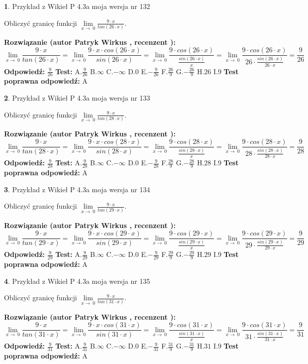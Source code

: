 \documentclass[12pt, a4paper]{article}
\theoremstyle{definition} %
\newtheorem{zad}{}
\newcommand{\zadStart}[1]{\begin{zad}#1\newline}
\newcommand{\zadStop}{\end{zad}}
\newcommand{\rozwStart}[2]{\noindent \textbf{Rozwiązanie (autor #1 , recenzent #2): }\newline}
\newcommand{\rozwStop}{\newline}
\newcommand{\odpStart}{\noindent \textbf{Odpowiedź:}\newline}
\newcommand{\odpStop}{\newline}
\newcommand{\testStart}{\noindent \textbf{Test:}\newline}
\newcommand{\testStop}{\newline}
\newcommand{\kluczStart}{\noindent \textbf{Test poprawna odpowiedź:}\newline}
\newcommand{\kluczStop}{\newline}
\begin{document}
\zadStart{Przykład z Wikieł P 4.3a moja wersja nr 132}


Obliczyć granicę funkcji $\lim\limits_{x\to\ 0}\frac{9 \cdot x}{tan(26 \cdot x)}$.
\zadStop
\rozwStart{Patryk Wirkus}{}
$$\lim\limits_{x\to\ 0}\frac{9 \cdot x}{tan(26 \cdot x)}=\lim\limits_{x\to\ 0}\frac{9 \cdot x \cdot cos(26 \cdot x)}{sin(26 \cdot x)}=\lim\limits_{x\to\ 0}\frac{9 \cdot cos(26 \cdot x)}{\frac{sin(26 \cdot x)}{x}}=\lim\limits_{x\to\ 0}\frac{9 \cdot cos(26 \cdot x)}{26 \cdot \frac{sin(26 \cdot x)}{26 \cdot x}} = \frac{9}{26}$$
\rozwStop
\odpStart
$\frac{9}{26}$
\odpStop
\testStart
A.$\frac{9}{26}$
B.$\infty$
C.$-\infty$
D.$0$
E.$-\frac{9}{26}$
F.$\frac{26}{9}$
G.$-\frac{26}{9}$
H.$26$
I.$9$
\testStop
\kluczStart
A
\kluczStop



\zadStart{Przykład z Wikieł P 4.3a moja wersja nr 133}


Obliczyć granicę funkcji $\lim\limits_{x\to\ 0}\frac{9 \cdot x}{tan(28 \cdot x)}$.
\zadStop
\rozwStart{Patryk Wirkus}{}
$$\lim\limits_{x\to\ 0}\frac{9 \cdot x}{tan(28 \cdot x)}=\lim\limits_{x\to\ 0}\frac{9 \cdot x \cdot cos(28 \cdot x)}{sin(28 \cdot x)}=\lim\limits_{x\to\ 0}\frac{9 \cdot cos(28 \cdot x)}{\frac{sin(28 \cdot x)}{x}}=\lim\limits_{x\to\ 0}\frac{9 \cdot cos(28 \cdot x)}{28 \cdot \frac{sin(28 \cdot x)}{28 \cdot x}} = \frac{9}{28}$$
\rozwStop
\odpStart
$\frac{9}{28}$
\odpStop
\testStart
A.$\frac{9}{28}$
B.$\infty$
C.$-\infty$
D.$0$
E.$-\frac{9}{28}$
F.$\frac{28}{9}$
G.$-\frac{28}{9}$
H.$28$
I.$9$
\testStop
\kluczStart
A
\kluczStop



\zadStart{Przykład z Wikieł P 4.3a moja wersja nr 134}


Obliczyć granicę funkcji $\lim\limits_{x\to\ 0}\frac{9 \cdot x}{tan(29 \cdot x)}$.
\zadStop
\rozwStart{Patryk Wirkus}{}
$$\lim\limits_{x\to\ 0}\frac{9 \cdot x}{tan(29 \cdot x)}=\lim\limits_{x\to\ 0}\frac{9 \cdot x \cdot cos(29 \cdot x)}{sin(29 \cdot x)}=\lim\limits_{x\to\ 0}\frac{9 \cdot cos(29 \cdot x)}{\frac{sin(29 \cdot x)}{x}}=\lim\limits_{x\to\ 0}\frac{9 \cdot cos(29 \cdot x)}{29 \cdot \frac{sin(29 \cdot x)}{29 \cdot x}} = \frac{9}{29}$$
\rozwStop
\odpStart
$\frac{9}{29}$
\odpStop
\testStart
A.$\frac{9}{29}$
B.$\infty$
C.$-\infty$
D.$0$
E.$-\frac{9}{29}$
F.$\frac{29}{9}$
G.$-\frac{29}{9}$
H.$29$
I.$9$
\testStop
\kluczStart
A
\kluczStop



\zadStart{Przykład z Wikieł P 4.3a moja wersja nr 135}


Obliczyć granicę funkcji $\lim\limits_{x\to\ 0}\frac{9 \cdot x}{tan(31 \cdot x)}$.
\zadStop
\rozwStart{Patryk Wirkus}{}
$$\lim\limits_{x\to\ 0}\frac{9 \cdot x}{tan(31 \cdot x)}=\lim\limits_{x\to\ 0}\frac{9 \cdot x \cdot cos(31 \cdot x)}{sin(31 \cdot x)}=\lim\limits_{x\to\ 0}\frac{9 \cdot cos(31 \cdot x)}{\frac{sin(31 \cdot x)}{x}}=\lim\limits_{x\to\ 0}\frac{9 \cdot cos(31 \cdot x)}{31 \cdot \frac{sin(31 \cdot x)}{31 \cdot x}} = \frac{9}{31}$$
\rozwStop
\odpStart
$\frac{9}{31}$
\odpStop
\testStart
A.$\frac{9}{31}$
B.$\infty$
C.$-\infty$
D.$0$
E.$-\frac{9}{31}$
F.$\frac{31}{9}$
G.$-\frac{31}{9}$
H.$31$
I.$9$
\testStop
\kluczStart
A
\kluczStop
\end{document}
